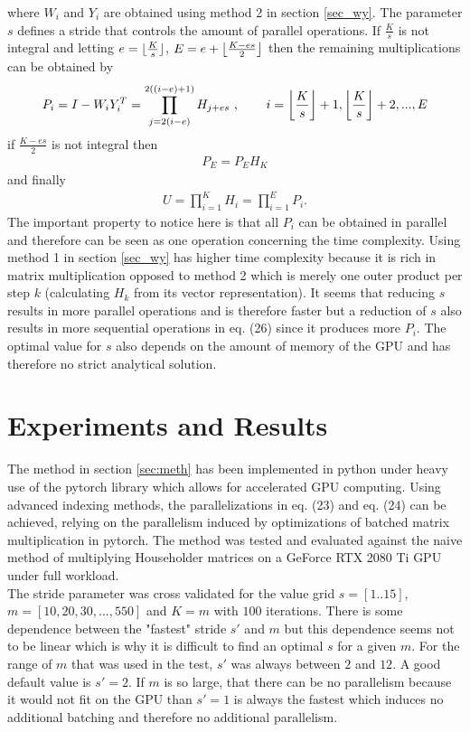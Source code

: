 \documentclass{article}
\DeclarePairedDelimiter\floor{\lfloor}{\rfloor}
\begin{document}
where $W_i$ and $Y_i$ are obtained using method 2 in section \ref{sec_wy}. The parameter $s$ defines a stride that controls the amount of parallel operations. If $\frac{K}{s}$ is not integral and letting $e=\floor{\frac{K}{s}}$,  $E=e+\floor*{\frac{K-es}{2}}$ then the remaining multiplications can be obtained by
\begin{align}
	P_i = I - W_iY_i^T = \prod_{j=2(i-e)}^{2((i-e)+1)}H_{j+es} \text{ ,\hspace{8mm}} i=\floor*{\frac{K}{s}}+1, \floor*{\frac{K}{s}}+2, ..., E
\end{align}
if $\frac{K-es}{2}$ is not integral then
\begin{align}
P_E = P_E H_K
\end{align}
and finally
\begin{align}
U = \prod_{i=1}^KH_i = \prod_{i=1}^{E} P_i.
\end{align}
The important property to notice here is that all $P_i$ can be obtained in parallel and therefore can be seen as one operation concerning the time complexity. Using method 1 in section \ref{sec_wy} has higher time complexity because it is rich in matrix multiplication opposed to method 2 which is merely one outer product per step $k$ (calculating $H_k$ from its vector representation). It seems that reducing $s$ results in more parallel operations and is therefore faster but a reduction of $s$ also results in more sequential operations in eq. (26) since it produces more $P_i$. The optimal value for $s$ also depends on the amount of memory of the GPU and has therefore no strict analytical solution.\\

\section{Experiments and Results}\label{sec:exp}
The method in section \ref{sec:meth} has been implemented in python under heavy use of the pytorch library which allows for accelerated GPU computing. Using advanced indexing methods, the parallelizations in eq. (23) and eq. (24) can be achieved, relying on the parallelism induced by optimizations of batched matrix multiplication in pytorch. The method was tested and evaluated against the naive method of multiplying Householder matrices on a GeForce RTX 2080 Ti GPU under full workload.\\
The stride parameter was cross validated for the value grid $s=[1..15]$, \\ $m=[10, 20, 30, ..., 550]$ and $K=m$ with $100$ iterations. There is some dependence between the "fastest" stride $s'$ and $m$ but this dependence seems not to be linear which is why it is difficult to find an optimal $s$ for a given $m$. For the range of $m$ that was used in the test, $s'$ was always between $2$ and $12$. A good default value is $s'=2$. If $m$ is so large, that there can be no parallelism because it would not fit on the GPU than $s'=1$ is always the fastest which induces no additional batching and therefore no additional parallelism.
\end{document}
